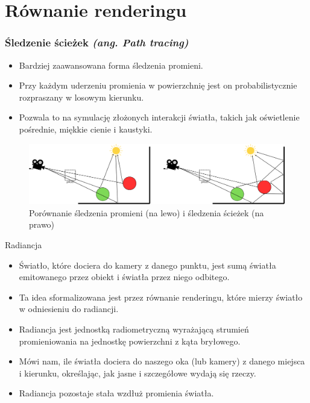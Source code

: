 \documentclass{beamer}
\begin{document}
\section{Równanie renderingu}
\begin{frame}
\frametitle{Śledzenie ścieżek \it{(ang. Path tracing)}}
\begin{itemize}
    \item Bardziej zaawansowana forma śledzenia promieni.
    \item Przy każdym uderzeniu promienia w powierzchnię jest on probabilistycznie rozpraszany w losowym kierunku.
    \item Pozwala to na symulację złożonych interakcji światła, takich jak oświetlenie pośrednie, miękkie cienie i kaustyki.
\end{itemize}
\end{frame}

\begin{frame}{}
    \begin{figure}
        \centering
        \includegraphics[width=1\linewidth]{img/path_vs_ray.png}
        \caption{Porównanie śledzenia promieni (na lewo) i śledzenia ścieżek (na prawo)}
        \label{fig:enter-label}
    \end{figure}
\end{frame}

\begin{frame}{Radiancja}
    \begin{itemize}
        \item Światło, które dociera do kamery z danego punktu, jest sumą światła emitowanego przez obiekt i światła przez niego odbitego.
        \item Ta idea sformalizowana jest przez równanie renderingu, które mierzy światło w odniesieniu do radiancji.
        \item Radiancja jest jednostką radiometryczną wyrażającą strumień promieniowania na jednostkę powierzchni z kąta bryłowego.
        \item Mówi nam, ile światła dociera do naszego oka (lub kamery) z danego miejsca i kierunku, określając, jak jasne i szczegółowe wydają się rzeczy.
        \item Radiancja pozostaje stała wzdłuż promienia światła.
    \end{itemize}
\end{frame}
\end{document}
